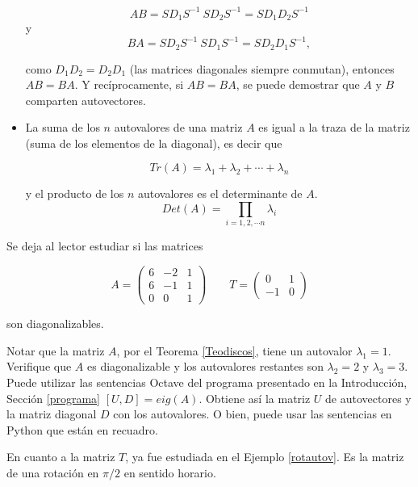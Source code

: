 \begin{remark}
\begin{itemize}
$$AB=  SD_1S^{-1} ~SD_2 S^{-1}=S  D_1D_2 S^{-1}$$
y
\bigskip
$$BA=  SD_2S^{-1} ~SD_1 S^{-1}= S D_2D_1 S^{-1},$$

\bigskip

como $D_1D_2=D_2D_1$  (las matrices diagonales siempre conmutan), entonces $AB=BA$. 
Y recíprocamente, si $AB=BA$, se puede demostrar que $A$ y $B$ comparten autovectores.

\item 

\bigskip

La suma de los $n$ autovalores de una matriz $A$ es igual a la traza de la matriz (suma de los elementos de la diagonal), es decir que 

$$Tr(A)= \lambda_1+ \lambda_2 + \cdots +\lambda_n$$

\noindent
y el producto de los $n$ autovalores  es el determinante de $A$.
$$Det(A)= \prod_{i=1,2,  \cdots n} \lambda_i$$ 
\end{itemize}
\end{remark}


\bigskip

\begin{example}

Se deja al lector estudiar si las matrices

$$A=\left(\begin{array}{ccc} 6 & -2 &  1 \\ 6 & -1 & 1
\\ 0 & 0 & 1
\end{array}
 \right)  \qquad  T=\left(\begin{array}{cc}  0 & 1  \\ -1 &  0
\end{array}
\right) $$

\noindent
son  diagonalizables.

 Notar que la matriz $A$, por el Teorema \ref{Teodiscos}, tiene un autovalor $\lambda_1=1$.
 Verifique que $A$ es diagonalizable y  los autovalores restantes son $\lambda_2=2$ y $\lambda_3=3$. Puede utilizar  las sentencias  Octave del programa presentado en la Introducción, Sección \ref{programa} $[U,D]=eig(A)$. Obtiene así la matriz $U$ de autovectores y la matriz diagonal $D$ con los autovalores. O bien, puede usar  las sentencias en Python que están en recuadro.

 \bigskip 
 
 En cuanto a la matriz $T$, ya fue estudiada en el Ejemplo \ref{rotautov}. Es la matriz de una rotación en $\pi/2$ en sentido horario.
 
\end{example}


